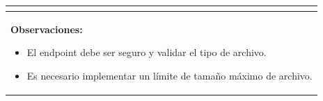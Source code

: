 \begin{table}[H]
\begin{center}
\begin{tabularx}{\textwidth}{|l|X|l|}
{\begin{itemize}
                \end{itemize}
            }\\
            \hline
            \multicolumn{3}{|p{\textwidth}|}{
                \textbf{Observaciones:}
                \begin{itemize}
                    \item El endpoint debe ser seguro y validar el tipo de archivo.
                    \item Es necesario implementar un límite de tamaño máximo de archivo.
                \end{itemize}
            }\\
            \hline
        \end{tabularx}
    \end{center}
\end{table}

